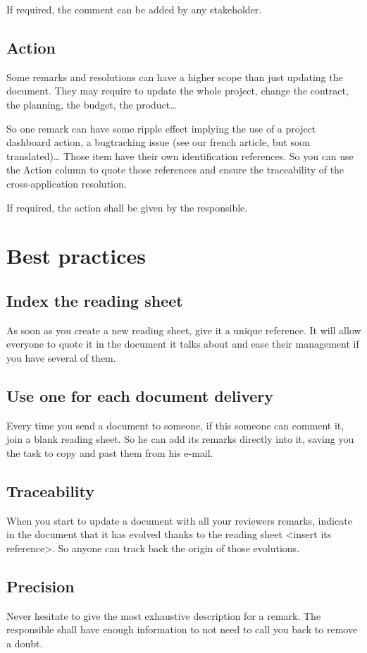 If required, the comment can be added by any stakeholder.

\subsection{Action}
Some remarks and resolutions can have a higher scope than just updating the document. They may require to update the whole project, change the contract, the planning, the budget, the product…

So one remark can have some ripple effect implying the use of a project dashboard action, a bugtracking issue (see our french article, but soon translated)… Those item have their own identification references. So you can use the Action column to quote those references and ensure the traceability of the cross-application resolution.

If required, the action shall be given by the responsible.

\section{Best practices}
\subsection{Index the reading sheet}
As soon as you create a new reading sheet, give it a unique reference. It will allow everyone to quote it in the document it talks about and ease their management if you have several of them.
\subsection{Use one for each document delivery}
Every time you send a document to someone, if this someone can comment it, join a blank reading sheet. So he can add its remarks directly into it, saving you the task to copy and past them from his e-mail.
\subsection{Traceability}
When you start to update a document with all your reviewers remarks, indicate in the document that it has evolved thanks to the reading sheet <insert its reference>. So anyone can track back the origin of those evolutions.
\subsection{Precision}
Never hesitate to give the most exhaustive description for a remark. The responsible shall have enough information to not need to call you back to remove a doubt.

